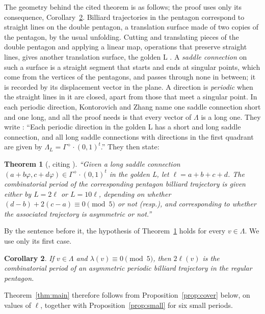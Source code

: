 \documentclass[11pt]{article}
\newtheorem{theorem}{Theorem}[section]
\newtheorem{corollary}[theorem]{Corollary}
\theoremstyle{definition}
\theoremstyle{remark}
\begin{document}
The geometry behind the cited theorem is as follows; the proof uses only
its consequence, Corollary~\ref{cor:period}. Billiard trajectories in the
pentagon correspond to straight lines on the double pentagon, a
translation surface made of two copies of the pentagon, by the usual
unfolding. Cutting and translating pieces of the double pentagon and
applying a linear map, operations that preserve straight lines, gives
another translation surface, the golden L \cite[\S2, Figure~2]{KZ}. A
\emph{saddle connection} on such a surface is a straight segment that
starts and ends at singular points, which come from the vertices of the
pentagons, and passes through none in between; it is recorded by its
displacement vector in the plane. A direction is \emph{periodic} when the
straight lines in it are closed, apart from those that meet a singular
point. In each periodic direction, Kontorovich and Zhang name one saddle
connection short and one long, and all the proof needs is that every
vector of $\Lambda$ is a long one. They write \cite[\S2]{KZ}:
``Each periodic direction in the golden L has a short and long saddle
connection, and all long saddle connections with directions in the first
quadrant are given by $\Lambda_L=\Gamma^+\cdot(0,1)^t$.'' They then state:

\begin{theorem}[{\cite[Theorem~2.1]{KZ}, citing \cite[Theorem~11]{DFT}}]\label{thm:dft}
``Given a long saddle connection $(a+b\varphi,c+d\varphi)\in\Gamma^+\cdot(0,1)^t$
in the golden L, let $\ell=a+b+c+d$. The combinatorial period of the
corresponding pentagon billiard trajectory is given either by $L=2\ell$ or
$L=10\ell$, depending on whether $(d-b)+2(c-a)\equiv0\pmod5$ or not
(resp.), and corresponding to whether the associated trajectory is
asymmetric or not.''
\end{theorem}

By the sentence before it, the hypothesis of Theorem~\ref{thm:dft} holds
for every $v\in\Lambda$. We use only its first case.

\begin{corollary}\label{cor:period}
If $v\in\Lambda$ and $\lambda(v)\equiv0\pmod5$, then $2\ell(v)$ is the
combinatorial period of an asymmetric periodic billiard trajectory in the
regular pentagon.
\end{corollary}

Theorem~\ref{thm:main} therefore follows from Proposition~\ref{prop:cover}
below, on values of $\ell$, together with Proposition~\ref{prop:small} for
six small periods.
\end{document}
